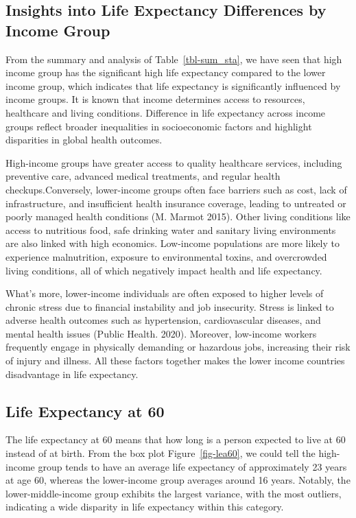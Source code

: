 \documentclass[
  letterpaper,
  DIV=11,
  numbers=noendperiod]{scrartcl}
\begin{document}
\subsection{Insights into Life Expectancy Differences by Income
Group}\label{insights-into-life-expectancy-differences-by-income-group}

From the summary and analysis of Table~\ref{tbl-sum_sta}, we have seen
that high income group has the significant high life expectancy compared
to the lower income group, which indicates that life expectancy is
significantly influenced by income groups. It is known that income
determines access to resources, healthcare and living conditions.
Difference in life expectancy across income groups reflect broader
inequalities in socioeconomic factors and highlight disparities in
global health outcomes.

High-income groups have greater access to quality healthcare services,
including preventive care, advanced medical treatments, and regular
health checkups.Conversely, lower-income groups often face barriers such
as cost, lack of infrastructure, and insufficient health insurance
coverage, leading to untreated or poorly managed health conditions (M.
Marmot 2015). Other living conditions like access to nutritious food,
safe drinking water and sanitary living environments are also linked
with high economics. Low-income populations are more likely to
experience malnutrition, exposure to environmental toxins, and
overcrowded living conditions, all of which negatively impact health and
life expectancy.

What's more, lower-income individuals are often exposed to higher levels
of chronic stress due to financial instability and job insecurity.
Stress is linked to adverse health outcomes such as hypertension,
cardiovascular diseases, and mental health issues (Public Health. 2020).
Moreover, low-income workers frequently engage in physically demanding
or hazardous jobs, increasing their risk of injury and illness. All
these factors together makes the lower income countries disadvantage in
life expectancy.

\subsection{Life Expectancy at 60}\label{life-expectancy-at-60}

The life expectancy at 60 means that how long is a person expected to
live at 60 instead of at birth. From the box plot
Figure~\ref{fig-lea60}, we could tell the high-income group tends to
have an average life expectancy of approximately 23 years at age 60,
whereas the lower-income group averages around 16 years. Notably, the
lower-middle-income group exhibits the largest variance, with the most
outliers, indicating a wide disparity in life expectancy within this
category.
\end{document}
